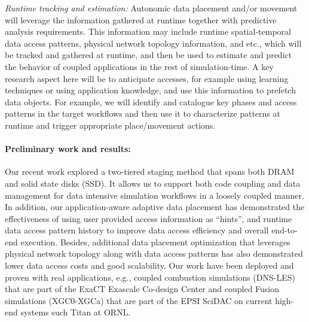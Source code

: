 {\em Runtime tracking and estimation:} Autonomic data placement and/or
movement will leverage the information gathered at runtime together with
predictive analysis requirements. This information may include runtime
spatial-temporal data access patterns, physical network topology
information, and etc., which will be tracked and gathered at runtime, and
then be used to estimate and predict the behavior of coupled applications in
the rest of simulation-time. A key research aspect here will be to
anticipate accesses, for example using learning techniques or using
application knowledge, and use this information to prefetch data objects.
For example, we will identify and catalogue key phases and access patterns
in the target workflows and then use it to characterize patterns at runtime
and trigger appropriate place/movement actions.

\paragraph{Preliminary work and results:} Our recent work \cite{tongipdps15}
explored a two-tiered staging method that spans both DRAM and solid state
disks (SSD). It allows us to support both code coupling and data management
for data intensive simulation workflows in a loosely coupled manner. In
addition, our application-aware adaptive data placement has demonstrated the
effectiveness of using user provided access information as ``hints'', and
runtime data access pattern history to improve data access efficiency and
overall end-to-end execution. Besides, additional data placement
optimization \cite{qiansc15} that leverages physical network topology along
with data access patterns has also demonstrated lower data access costs and
good scalability. Our work have been deployed and proven with real
applications, e.g., coupled combustion simulations (DNS-LES) that are part
of the ExaCT Exascale Co-design Center and coupled Fusion simulations
(XGC0-XGCa) that are part of the EPSI SciDAC on current high-end systems
such Titan at ORNL.
